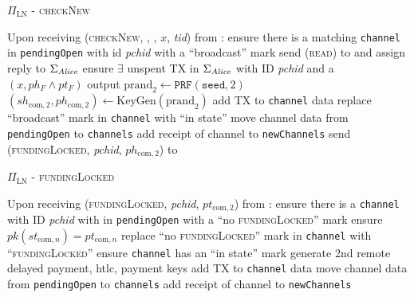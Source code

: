 \begin{protocolbox}{$\Pi_{\mathrm{LN}}$ - \textsc{checkNew}}
  \label{alg:protocol:open:checkNew}
  \begin{algorithmic}[1]
    \State {}
    \State Upon receiving (\textsc{checkNew}, \alice, \bob, $x$, \textit{tid})
    from \environment: 
    \Indent
      \State ensure there is a matching \texttt{channel} in \texttt{pendingOpen}
      with id \textit{pchid} with a ``broadcast'' mark
      \State send (\textsc{read}) to \ledger{} and assign reply to
      $\Sigma_{\mathit{Alice}}$
      \State ensure $\exists$ unspent TX in $\Sigma_{\mathit{Alice}}$ with ID
      \textit{pchid} and a $\left(x, ph_F \wedge pt_F\right)$ output
      \State $\mathrm{prand}_2 \gets \texttt{PRF}\left(\mathtt{seed}, 2\right)$
      \State $\left(sh_{\mathrm{com}, 2}, ph_{\mathrm{com}, 2}\right) \gets
      \mathrm{KeyGen}\left(\mathrm{prand}_2\right)$
      \State add TX to \texttt{channel} data \State replace ``broadcast'' mark
      in \texttt{channel} with ``in state''
        \State move channel data from \texttt{pendingOpen} to \texttt{channels}
        \State add receipt of channel to \texttt{newChannels}
      \EndIf
      \State send (\textsc{fundingLocked}, \textit{pchid}, $ph_{\mathrm{com},
      2}$) to \bob{}
    \EndIndent
  \end{algorithmic}
\end{protocolbox}

\begin{protocolbox}{$\Pi_{\mathrm{LN}}$ - \textsc{fundingLocked}}
  \label{alg:protocol:open:fundingLocked}
  \begin{algorithmic}[1]
    \State Upon receiving (\textsc{fundingLocked}, \textit{pchid},
    $pt_{\mathrm{com}, 2}$) from \bob:
    \Indent
      \State ensure there is a \texttt{channel} with ID \textit{pchid} with
      \bob{} in \texttt{pendingOpen} with a ``no \textsc{fundingLocked}'' mark
      \State ensure $pk\left(st_{\mathrm{com}, n}\right) = pt_{\mathrm{com}, n}$
      \State replace ``no \textsc{fundingLocked}'' mark in \texttt{channel} with
      ``\textsc{fundingLocked}''
      \State ensure \texttt{channel} has an ``in state'' mark
      \State generate 2nd remote delayed payment, htlc, payment keys
      \State add TX to \texttt{channel} data
      \State move channel data from \texttt{pendingOpen} to \texttt{channels}
      \State add receipt of channel to \texttt{newChannels}
    \EndIndent
  \end{algorithmic}
\end{protocolbox}

